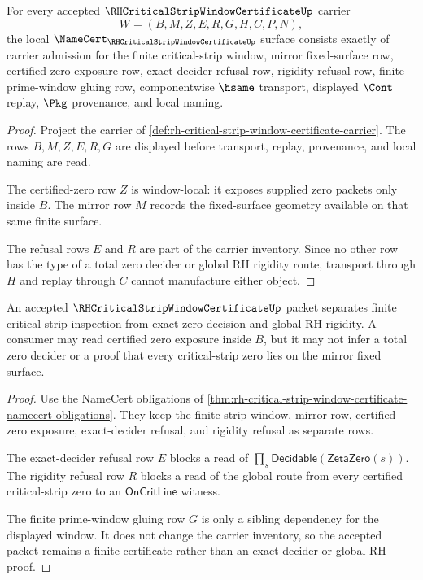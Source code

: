 \begin{theorem}
\label{thm:rh-critical-strip-window-certificate-namecert-obligations}
For every accepted $\RHCriticalStripWindowCertificateUp$ carrier
$$
W=(B,M,Z,E,R,G,H,C,P,N),
$$
the local $\NameCert_{\RHCriticalStripWindowCertificateUp}$ surface consists exactly of carrier admission for the finite critical-strip window, mirror fixed-surface row, certified-zero exposure row, exact-decider refusal row, rigidity refusal row, finite prime-window gluing row, componentwise $\hsame$ transport, displayed $\Cont$ replay, $\Pkg$ provenance, and local naming.
\end{theorem}
\begin{proof}
Project the carrier of \autoref{def:rh-critical-strip-window-certificate-carrier}. The rows $B,M,Z,E,R,G$ are displayed before transport, replay, provenance, and local naming are read.

The certified-zero row $Z$ is window-local: it exposes supplied zero packets only inside $B$. The mirror row $M$ records the fixed-surface geometry available on that same finite surface.

The refusal rows $E$ and $R$ are part of the carrier inventory. Since no other row has the type of a total zero decider or global RH rigidity route, transport through $H$ and replay through $C$ cannot manufacture either object.
\end{proof}

\begin{theorem}
\label{thm:rh-critical-strip-window-certificate-boundary-separation}
An accepted $\RHCriticalStripWindowCertificateUp$ packet separates finite critical-strip inspection from exact zero decision and global RH rigidity. A consumer may read certified zero exposure inside $B$, but it may not infer a total zero decider or a proof that every critical-strip zero lies on the mirror fixed surface.
\end{theorem}
\begin{proof}
Use the NameCert obligations of \autoref{thm:rh-critical-strip-window-certificate-namecert-obligations}. They keep the finite strip window, mirror row, certified-zero exposure, exact-decider refusal, and rigidity refusal as separate rows.

The exact-decider refusal row $E$ blocks a read of $\prod_s\mathsf{Decidable}(\mathsf{ZetaZero}(s))$. The rigidity refusal row $R$ blocks a read of the global route from every certified critical-strip zero to an $\mathsf{OnCritLine}$ witness.

The finite prime-window gluing row $G$ is only a sibling dependency for the displayed window. It does not change the carrier inventory, so the accepted packet remains a finite certificate rather than an exact decider or global RH proof.
\end{proof}


